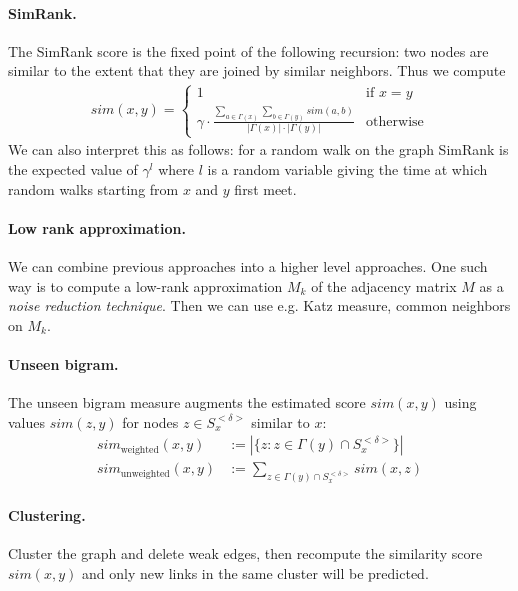 \paragraph{SimRank.} The SimRank score is the fixed point of the following recursion: two nodes are similar to the extent that they are joined by similar neighbors. Thus we compute
\begin{align*}
    sim(x,y) =
                \begin{cases}
                    1 & \text{if } x=y\\
                    \gamma \cdot \frac{\sum_{a \in \Gamma(x)} \sum_{b \in \Gamma(y)} sim(a,b)}{|\Gamma(x)| \cdot |\Gamma(y)|} & \text{otherwise}
                \end{cases}
\end{align*}
We can also interpret this as follows: for a random walk on the graph SimRank is the expected value of $\gamma^l$ where $l$ is a random variable giving the time at which random walks starting from $x$ and $y$ first meet.

\paragraph{Low rank approximation.} We can combine previous approaches into a higher level approaches. One such way is to compute a low-rank approximation $M_k$ of the adjacency matrix $M$ as a \emph{noise reduction technique}. Then we can use e.g. Katz measure, common neighbors on $M_k$.

\paragraph{Unseen bigram.} The unseen bigram measure augments the estimated score $sim(x,y)$ using values $sim(z,y)$ for nodes $z \in S_x^{<\delta>}$ similar to $x$:
\begin{align*}
    sim_\text{weighted}(x,y) &:= |\{ z : z \in \Gamma(y) \cap S_x^{<\delta>} \}| \\
    sim_\text{unweighted}(x,y) &:= \sum_{z \in \Gamma(y) \cap S_x^{<\delta>}} sim(x,z)
\end{align*}

\paragraph{Clustering.} Cluster the graph and delete weak edges, then recompute the similarity score $sim(x,y)$ and only new links in the same cluster will be predicted.

